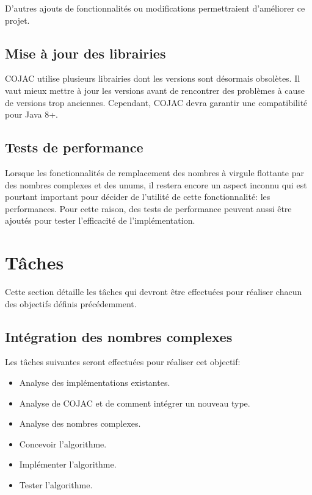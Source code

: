 D'autres ajouts de fonctionnalités ou modifications permettraient d'améliorer ce projet.

\subsection{Mise à jour des librairies}

COJAC \cite{COJAC} utilise plusieurs librairies dont les versions sont désormais obsolètes. Il vaut mieux mettre à jour les versions avant de rencontrer des problèmes à cause de versions trop anciennes. Cependant, COJAC \cite{COJAC} devra garantir une compatibilité pour Java 8+.

\subsection{Tests de performance}

Lorsque les fonctionnalités de remplacement des nombres à virgule flottante par des nombres complexes et des unums, il restera encore un aspect inconnu qui est pourtant important pour décider de l'utilité de cette fonctionnalité: les performances. Pour cette raison, des tests de performance peuvent aussi être ajoutés pour tester l'efficacité de l'implémentation.

\section{Tâches}

Cette section détaille les tâches qui devront être effectuées pour réaliser chacun des objectifs définis précédemment.

\subsection{Intégration des nombres complexes}

Les tâches suivantes seront effectuées pour réaliser cet objectif:
\begin{itemize}
    \item Analyse des implémentations existantes.
    \item Analyse de COJAC et de comment intégrer un nouveau type.
    \item Analyse des nombres complexes.
    \item Concevoir l'algorithme.
    \item Implémenter l'algorithme.
    \item Tester l'algorithme.
\end{itemize}

